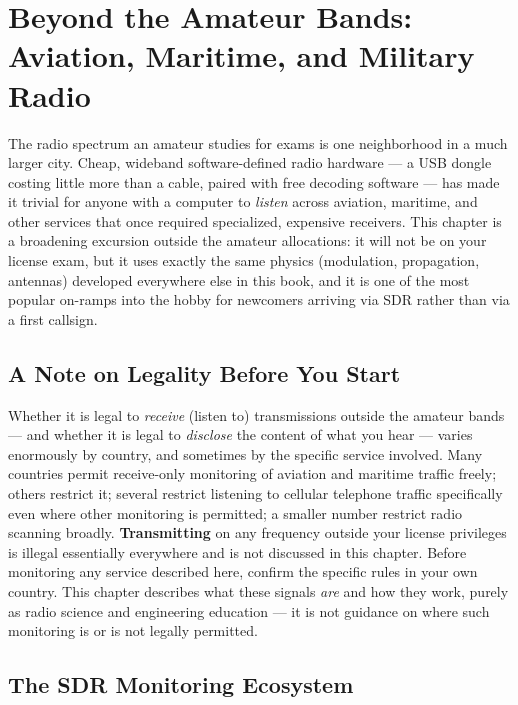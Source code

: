 \chapter{Beyond the Amateur Bands: Aviation, Maritime, and Military Radio}
\label{ch:beyond-amateur}

The radio spectrum an amateur studies for exams is one neighborhood in
a much larger city. Cheap, wideband software-defined radio hardware ---
a USB dongle costing little more than a cable, paired with free
decoding software --- has made it trivial for anyone with a computer to
\emph{listen} across aviation, maritime, and other services that once
required specialized, expensive receivers. This chapter is a
broadening excursion outside the amateur allocations: it will not be on
your license exam, but it uses exactly the same physics (modulation,
propagation, antennas) developed everywhere else in this book, and it
is one of the most popular on-ramps into the hobby for newcomers
arriving via SDR rather than via a first callsign.

\section{A Note on Legality Before You Start}

\begin{safetynote}
Whether it is legal to \emph{receive} (listen to) transmissions outside
the amateur bands --- and whether it is legal to \emph{disclose} the
content of what you hear --- varies enormously by country, and
sometimes by the specific service involved. Many countries permit
receive-only monitoring of aviation and maritime traffic freely; others
restrict it; several restrict listening to cellular telephone traffic
specifically even where other monitoring is permitted; a smaller number
restrict radio scanning broadly. \textbf{Transmitting} on any frequency
outside your license privileges is illegal essentially everywhere and
is not discussed in this chapter. Before monitoring any service
described here, confirm the specific rules in your own country. This
chapter describes what these signals \emph{are} and how they work,
purely as radio science and engineering education --- it is not
guidance on where such monitoring is or is not legally permitted.
\end{safetynote}

\section{The SDR Monitoring Ecosystem}

